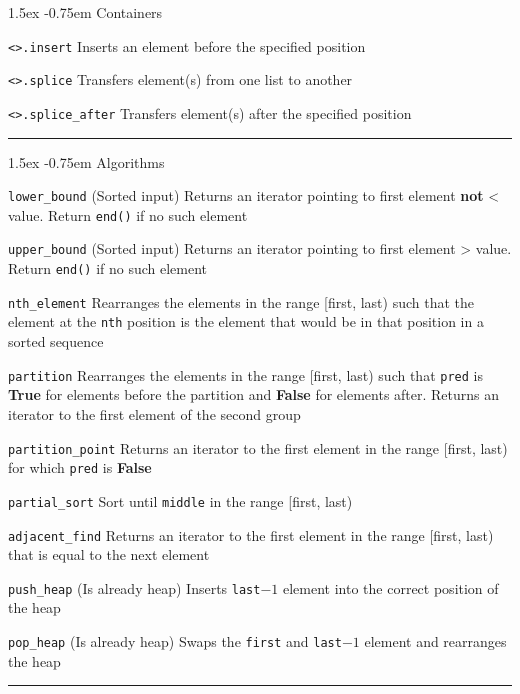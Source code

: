 \documentclass[landscape]{article}
\makeatletter
\newcommand{\True}{\textbf{True}}
\newcommand{\False}{\textbf{False}}
\renewcommand{\paragraph}{\@startsection{paragraph}{4}{\z@}%
                                    {1.5ex}%
                                    {-0.75em}%
                                    {\normalfont\normalsize\bfseries}}
\newcommand{\sep}{\noindent\rule{\linewidth}{0.4pt}}
\newcommand{\sepdotted}{\noindent\makebox[\linewidth]{\dotfill}}
\newcommand{\highlight}[2][sky!30]{\setlength{\fboxsep}{0pt}\colorbox{#1}{#2}}
\makeatother
\begin{document}
\begin{multicols*}{3}
        \paragraph{Containers}\mbox{}
        \par\noindent\lstinline{<>.insert} Inserts an element \highlight{before} the specified position
        \par\noindent\lstinline{<>.splice} Transfers element(s) from one list to another
        \par\noindent\lstinline{<>.splice_after} Transfers element(s) \highlight{after} the specified position
        \\\sep

        \paragraph{Algorithms}\mbox{}
        \par\noindent\textcolor{clime}{\texttt{lower\_bound}} (Sorted input) Returns an iterator pointing to \highlight{first element \textbf{not} < value}. Return \texttt{end()} if no such element
        \par\noindent\textcolor{clime}{\texttt{upper\_bound}} (Sorted input) Returns an iterator pointing to \highlight{first element > value}. Return \texttt{end()} if no such element
        \par\noindent\textcolor{corange}{\texttt{nth\_element}} Rearranges the elements in the range \highlight{[first, last)} such that the element at the \texttt{nth} position is the element that would be in that position in a sorted sequence
        \\\sepdotted
        \par\noindent\textcolor{corange}{\texttt{partition}} Rearranges the elements in the range \highlight{[first, last)} such that \texttt{pred} is \True{} for elements before the partition and \False{} for elements after. Returns an iterator to the first element of the second group
        \par\noindent\textcolor{corange}{\texttt{partition\_point}} Returns an iterator to the first element in the range \highlight{[first, last)} for which \texttt{pred} is \False{}
        \\\sepdotted
        \par\noindent\textcolor{cred}{\texttt{partial\_sort}} Sort until \texttt{middle} in the range \highlight{[first, last)}
        \par\noindent\textcolor{corange}{\texttt{adjacent\_find}} Returns an iterator to the first element in the range \highlight{[first, last)} that is equal to the next element
        \\\sepdotted
        \par\noindent\textcolor{clime}{\texttt{push\_heap}} (Is already heap) \highlight{Inserts \texttt{last$-1$}} element into the correct position of the heap
        \par\noindent\textcolor{clime}{\texttt{pop\_heap}} (Is already heap) \highlight{Swaps the \texttt{first} and \texttt{last$-1$}} element and rearranges the heap
        \\\sep


\end{multicols*}
\end{document}
